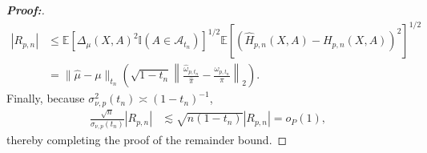 \documentclass[10pt,a4paper]{amsart}
\begin{document}
\begin{proof}[\textbf{Proof:}]
\begin{align*}
     |R_{p,n}| &\leq \mathbb{E}\!\left[ \Delta_\mu(X,A)^2 \mathbb{I}(A\in\mathcal A_{t_n})\right]^{1/2} \mathbb{E}\!\left[\left(\widehat H_{p,n}(X,A)-H_{p,n}(X,A) \right)^2 \right]^{1/2} \\
    &= \|\widehat\mu-\mu\|_{t_n} \left(\sqrt{1-t_n} \left\| \frac{\widehat\omega_{p,t_n}}{\widehat\pi} - \frac{\omega_{p,t_n}}{\pi} \right\|_2 \right).
\end{align*}
Finally, because $\sigma_{\nu,p}^2(t_n)\asymp(1-t_n)^{-1}$,
\begin{align*}
    \frac{\sqrt{n}}{\sigma_{\nu,p}(t_n)} |R_{p,n}| &\lesssim
    \sqrt{n(1-t_n)}|R_{p,n}| =o_P(1),
\end{align*}
thereby completing the proof of the remainder bound. 

\medskip 


\end{proof}
\end{document}
